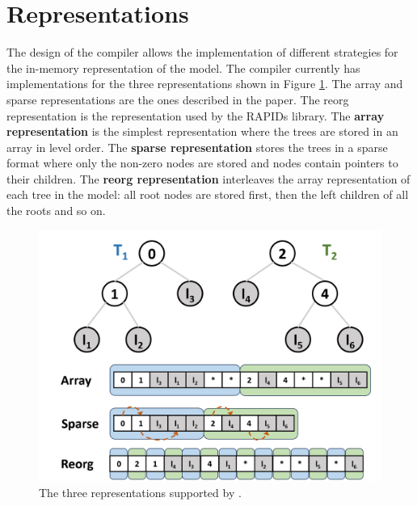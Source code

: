 \section{Representations}
\label{sec:representations}

The design of the \Treebeard{} compiler allows the implementation of different strategies for 
the in-memory representation of the model. The compiler currently has implementations for 
the three representations shown in Figure \ref{Fig:Representations}. The array and sparse 
representations are the ones described in the \Treebeard{} paper\cite{Treebeard}. The reorg 
representation is the representation used by the RAPIDs library\cite{RAPIDs}. 
The \textbf{array representation} is the simplest representation where the trees are stored in an array
in level order. The \textbf{sparse representation} stores the trees in a sparse format where only the
non-zero nodes are stored and nodes contain pointers to their children. The \textbf{reorg representation}
interleaves the array representation of each tree in the model: all root nodes are stored first, then 
the left children of all the roots and so on.
\begin{figure}[htb]
  \centering
  \includegraphics[width=\linewidth]{figures/representations.png}
  \caption{The three representations supported by \Treebeard{}.}
  \label{Fig:Representations}
\end{figure}

